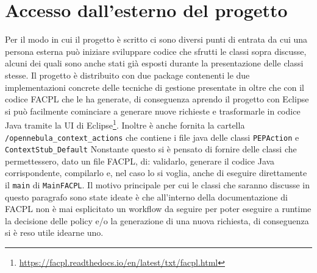 \section{Accesso dall'esterno del progetto}
Per il modo in cui il progetto è scritto ci sono diversi punti di entrata da cui una persona esterna può iniziare sviluppare codice che sfrutti le classi sopra discusse, alcuni dei quali sono anche stati già esposti durante la presentazione delle classi stesse. Il progetto è distribuito con due package contenenti le due implementazioni concrete delle tecniche di gestione presentate in \cite{10.1007/978-3-319-08260-8_6} oltre che con il codice FACPL che le ha generate, di conseguenza aprendo il progetto con Eclipse si può facilmente cominciare a generare nuove richieste e trasformarle in codice Java tramite la UI di Eclipse\footnote{\url{https://facpl.readthedocs.io/en/latest/txt/facpl.html}}. Inoltre è anche fornita la cartella \texttt{/opennebula\_context\_actions} che contiene i file java delle classi \texttt{PEPAction} e \texttt{ContextStub\_Default}\medbreak
Nonstante questo si è pensato di fornire delle classi che permettessero, dato un file FACPL, di: validarlo, generare il codice Java corrispondente, compilarlo e, nel caso lo si voglia, anche di eseguire direttamente il \texttt{main} di \texttt{MainFACPL}. Il motivo principale per cui le classi che saranno discusse in questo paragrafo sono state ideate è che all'interno della documentazione di FACPL non è mai esplicitato un workflow da seguire per poter eseguire a runtime la decisione delle policy e/o la generazione di una nuova richiesta, di conseguenza si è reso utile idearne uno.
